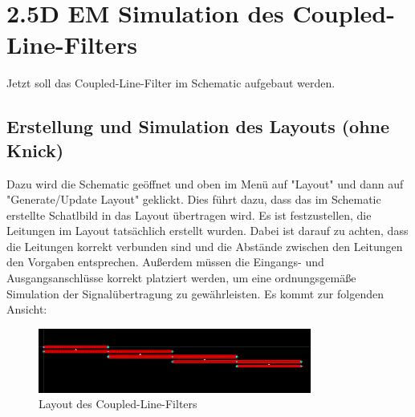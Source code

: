 \section{2.5D EM Simulation des Coupled-Line-Filters}

Jetzt soll das Coupled-Line-Filter im Schematic aufgebaut werden. 
\subsection{Erstellung und Simulation des Layouts (ohne Knick)}
Dazu wird die Schematic geöffnet und oben im Menü auf "Layout" und dann auf "Generate/Update Layout" geklickt. Dies führt dazu, dass das im Schematic erstellte Schatlbild in das Layout übertragen wird. Es ist festzustellen, die Leitungen im Layout tatsächlich erstellt wurden. Dabei ist darauf zu achten, dass die Leitungen korrekt verbunden sind und die Abstände zwischen den Leitungen den Vorgaben entsprechen. Außerdem müssen die Eingangs- und Ausgangsanschlüsse korrekt platziert werden, um eine ordnungsgemäße Simulation der Signalübertragung zu gewährleisten.
Es kommt zur folgenden Ansicht:
\begin{figure}[H]
    \centering
    \includegraphics[width=0.8\textwidth]{Pictures/LayoutohneKnick.png}
    \caption{Layout des Coupled-Line-Filters}
\end{figure}

